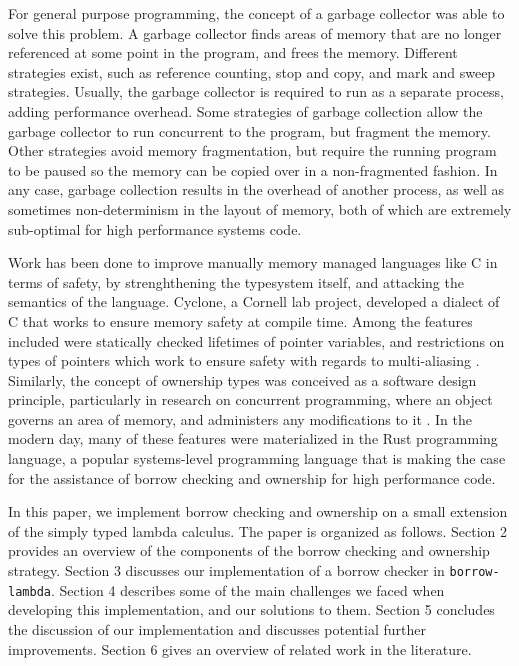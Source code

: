\documentclass[letterpaper,11pt]{article}
\begin{document}
For general purpose programming, the concept of a garbage collector was able to solve
this problem. A garbage collector finds areas of memory that are no longer referenced
at some point in the program, and frees the memory. Different strategies exist, such
as reference counting, stop and copy, and mark and sweep strategies. Usually, the
garbage collector is required to run as a separate process, adding performance
overhead. Some strategies of garbage collection allow the garbage collector to run
concurrent to the program, but fragment the memory. Other strategies avoid memory
fragmentation, but require the running program to be paused so the memory can be
copied over in a non-fragmented fashion. In any case, garbage collection results
in the overhead of another process, as well as sometimes non-determinism in the layout
of memory, both of which are extremely sub-optimal for high performance systems code.

Work has been done to improve manually memory managed languages like C in terms of
safety, by strenghthening the typesystem itself, and attacking the semantics of the
language. Cyclone, a Cornell lab project, developed a dialect of C that works to
ensure memory safety at compile time. Among the features included were statically
checked lifetimes of pointer variables, and restrictions on types of pointers which
work to ensure safety with regards to multi-aliasing \cite{grossman2002region}. Similarly, the
concept of ownership types was conceived as a software design principle, particularly
in research on concurrent programming, where an object governs an area of memory,
and administers any modifications to it \cite{boyapati2002ownership} \cite{gordon2012uniqueness}. In the modern day,
many of these features were materialized in the Rust programming language, a popular
systems-level programming language that is making the case for the assistance of
borrow checking and ownership for high performance code.

In this paper, we implement borrow checking and ownership on a small extension of the
simply typed lambda calculus. The paper is organized as follows. Section 2 provides an
overview of the components of the borrow checking and ownership strategy. Section 3
discusses our implementation of a borrow checker in \texttt{borrow-lambda}.
Section 4 describes some of the main challenges we faced when developing this
implementation, and our solutions to them. Section 5 concludes the discussion
of our implementation and discusses potential further improvements. Section 6
gives an overview of related work in the literature.
\end{document}
